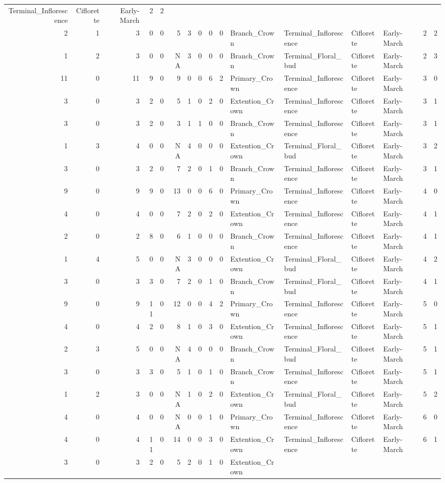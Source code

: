 \documentclass[]{article}
\begin{document}
\begin{longtable}[]{@{}rrrrrrrrrrllllrl@{}}
Terminal\_Inflorescence & Ciflorette & Early-March & 2 &
2\tabularnewline
2 & 1 & 3 & 0 & 0 & 5 & 3 & 0 & 0 & 0 & Branch\_Crown &
Terminal\_Inflorescence & Ciflorette & Early-March & 2 &
2\tabularnewline
1 & 2 & 3 & 0 & 0 & NA & 3 & 0 & 0 & 0 & Branch\_Crown &
Terminal\_Floral\_bud & Ciflorette & Early-March & 2 & 3\tabularnewline
11 & 0 & 11 & 9 & 0 & 9 & 0 & 0 & 6 & 2 & Primary\_Crown &
Terminal\_Inflorescence & Ciflorette & Early-March & 3 &
0\tabularnewline
3 & 0 & 3 & 2 & 0 & 5 & 1 & 0 & 2 & 0 & Extention\_Crown &
Terminal\_Inflorescence & Ciflorette & Early-March & 3 &
1\tabularnewline
3 & 0 & 3 & 2 & 0 & 3 & 1 & 1 & 0 & 0 & Branch\_Crown &
Terminal\_Inflorescence & Ciflorette & Early-March & 3 &
1\tabularnewline
1 & 3 & 4 & 0 & 0 & NA & 4 & 0 & 0 & 0 & Extention\_Crown &
Terminal\_Floral\_bud & Ciflorette & Early-March & 3 & 2\tabularnewline
3 & 0 & 3 & 2 & 0 & 7 & 2 & 0 & 1 & 0 & Branch\_Crown &
Terminal\_Inflorescence & Ciflorette & Early-March & 3 &
1\tabularnewline
9 & 0 & 9 & 9 & 0 & 13 & 0 & 0 & 6 & 0 & Primary\_Crown &
Terminal\_Inflorescence & Ciflorette & Early-March & 4 &
0\tabularnewline
4 & 0 & 4 & 0 & 0 & 7 & 2 & 0 & 2 & 0 & Extention\_Crown &
Terminal\_Inflorescence & Ciflorette & Early-March & 4 &
1\tabularnewline
2 & 0 & 2 & 8 & 0 & 6 & 1 & 0 & 0 & 0 & Branch\_Crown &
Terminal\_Inflorescence & Ciflorette & Early-March & 4 &
1\tabularnewline
1 & 4 & 5 & 0 & 0 & NA & 3 & 0 & 0 & 0 & Extention\_Crown &
Terminal\_Floral\_bud & Ciflorette & Early-March & 4 & 2\tabularnewline
3 & 0 & 3 & 3 & 0 & 7 & 2 & 0 & 1 & 0 & Branch\_Crown &
Terminal\_Floral\_bud & Ciflorette & Early-March & 4 & 1\tabularnewline
9 & 0 & 9 & 11 & 0 & 12 & 0 & 0 & 4 & 2 & Primary\_Crown &
Terminal\_Inflorescence & Ciflorette & Early-March & 5 &
0\tabularnewline
4 & 0 & 4 & 2 & 0 & 8 & 1 & 0 & 3 & 0 & Extention\_Crown &
Terminal\_Inflorescence & Ciflorette & Early-March & 5 &
1\tabularnewline
2 & 3 & 5 & 0 & 0 & NA & 4 & 0 & 0 & 0 & Branch\_Crown &
Terminal\_Floral\_bud & Ciflorette & Early-March & 5 & 1\tabularnewline
3 & 0 & 3 & 3 & 0 & 5 & 1 & 0 & 1 & 0 & Branch\_Crown &
Terminal\_Inflorescence & Ciflorette & Early-March & 5 &
1\tabularnewline
1 & 2 & 3 & 0 & 0 & NA & 1 & 0 & 2 & 0 & Extention\_Crown &
Terminal\_Floral\_bud & Ciflorette & Early-March & 5 & 2\tabularnewline
4 & 0 & 4 & 0 & 0 & NA & 0 & 0 & 1 & 0 & Primary\_Crown &
Terminal\_Inflorescence & Ciflorette & Early-March & 6 &
0\tabularnewline
4 & 0 & 4 & 11 & 0 & 14 & 0 & 0 & 3 & 0 & Extention\_Crown &
Terminal\_Inflorescence & Ciflorette & Early-March & 6 &
1\tabularnewline
3 & 0 & 3 & 2 & 0 & 5 & 2 & 0 & 1 & 0 & Extention\_Crown &

\end{longtable}
\end{document}
